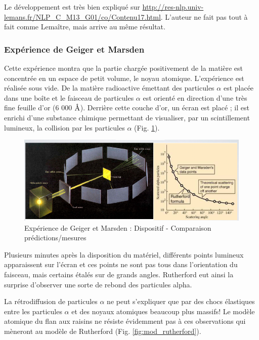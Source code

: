 Le développement est très bien expliqué sur \url{http://res-nlp.univ-lemans.fr/NLP_C_M13_G01/co/Contenu17.html}. L'auteur ne fait pas tout à fait comme Lemaître, mais arrive au même résultat.

\subsubsection{Expérience de Geiger et Marsden}

Cette expérience montra que la partie chargée positivement de la matière est concentrée en un espace de petit volume, le noyau atomique. L'expérience est réalisée sous vide. De la matière radioactive émettant des particules $\alpha$ est placée dans une boîte et le faisceau de particules $\alpha$ est orienté en direction d'une très fine feuille d'or (6 000 $\textup{\AA}$). Derrière cette couche d'or, un écran est placé ; il est enrichi d'une substance chimique permettant de visualiser, par un scintillement lumineux, la collision par les particules $\alpha$ (Fig. \ref{fig:geiger_marsden}).

\begin{figure}[ht]
    \centering
    \includegraphics[scale=0.75]{Images1/geiger.PNG}
    \caption{Expérience de Geiger et Marsden : Dispositif - Comparaison prédictions/mesures}
    \label{fig:geiger_marsden}
\end{figure}

Plusieurs minutes après la disposition du matériel, différents points lumineux apparaissent sur l'écran et ces points ne sont pas tous dans l'orientation du faisceau, mais certains étalés sur de grands angles. Rutherford eut ainsi la surprise d'observer une sorte de rebond des particules alpha.

La rétrodiffusion de particules $\alpha$ ne peut s’expliquer que par des chocs élastiques entre les particules $\alpha$ et des noyaux atomiques beaucoup plus massifs! Le modèle atomique du flan aux raisins ne résiste évidemment pas à ces observations qui mèneront au modèle de Rutherford (Fig. \ref{fig:mod_rutherford}).

